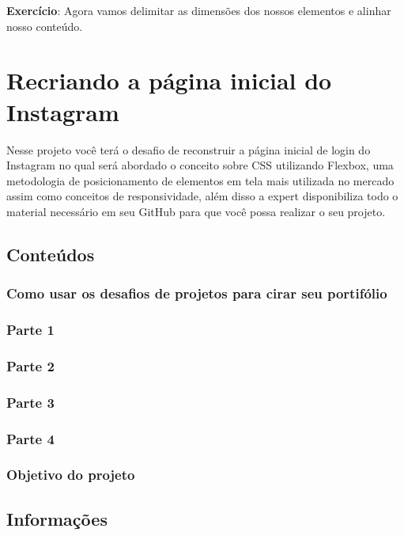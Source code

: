 \documentclass[12pt,a4paper]{article}
\begin{document}
	\textbf{Exercício}: Agora vamos delimitar as dimensões dos nossos elementos e alinhar nosso conteúdo.
	
	\section{Recriando a página inicial do Instagram}
	
	Nesse projeto você terá o desafio de reconstruir a página inicial de login do Instagram no qual será abordado o conceito sobre CSS utilizando Flexbox, uma metodologia de posicionamento de elementos em tela mais utilizada no mercado assim como conceitos de responsividade, além disso a expert disponibiliza todo o material necessário em seu GitHub para que você possa realizar o seu projeto.
	
	\subsection{Conteúdos}
	\subsubsection{Como usar os desafios de projetos para cirar seu portifólio}
	
	\subsubsection{Parte 1}
	
	\subsubsection{Parte 2}
	
	\subsubsection{Parte 3}
	
	\subsubsection{Parte 4}
	
	\subsubsection{Objetivo do projeto}
	
	
	\subsection{Informações}
	
\end{document}
